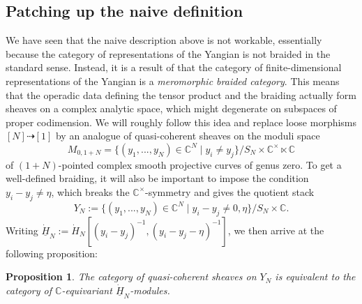\documentclass[11pt]{report}
\newtheorem{prop}[theorem]{Proposition}
\theoremstyle{definition}
\theoremstyle{remark}
\theoremstyle{remark}
\newcommand{\C}{\mathbb{C}}
\begin{document}
\subsection{Patching up the naive definition}\label{subsection:patch}

We have seen that the naive description above is not workable, essentially because the category of representations of the Yangian is not braided in the standard sense. Instead, it is a result of \cite{article:soibelman:1997} that the category of finite-dimensional representations of the Yangian is a \emph{meromorphic braided category}. This means that the operadic data defining the tensor product and the braiding actually form sheaves on a complex analytic space, which might degenerate on subspaces of proper codimension. We will roughly follow this idea and replace loose morphisms $[N] \dashrightarrow [1]$ by an analogue of quasi-coherent sheaves on the moduli space
\begin{equation*}
M_{0,1+N} = \{ (y_1,...,y_N) \in \C^N \mid y_i \neq y_j \} / S_N \times \C^\times \ltimes \C
\end{equation*}
of $(1+N)$-pointed complex smooth projective curves of genus zero. To get a well-defined braiding, it will also be important to impose the condition $y_i-y_j \neq \eta$, which breaks the $\C^\times$-symmetry and gives the quotient stack
\begin{equation*}
Y_N := \{ (y_1,...,y_N) \in \C^N \mid y_i-y_j \neq 0,\eta \}/S_N \times \C.
\end{equation*}
Writing $\underline{\dot H}_N := \dot H_N[(y_i-y_j)^{-1},(y_i-y_j-\eta)^{-1}]$, we then arrive at the following proposition:

\begin{prop}
The category of quasi-coherent sheaves on $Y_N$ is equivalent to the category of $\C$-equivariant $\underline{\dot H}_N$-modules.
\end{prop}
\end{document}
